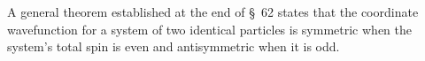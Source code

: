 A general theorem established at the end of \S~62 states that the coordinate wavefunction for a system of two identical particles is symmetric when the system's total spin is even and antisymmetric when it is odd.
